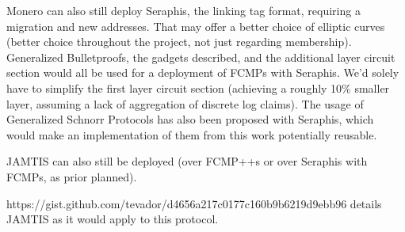 \documentclass[]{article}
\begin{document}
Monero can also still deploy Seraphis, the linking tag format, requiring a migration and new addresses. That may offer a better choice of elliptic curves (better choice throughout the project, not just regarding membership). Generalized Bulletproofs, the gadgets described, and the additional layer circuit section would all be used for a deployment of FCMPs with Seraphis. We'd solely have to simplify the first layer circuit section (achieving a roughly 10\% smaller layer, assuming a lack of aggregation of discrete log claims). The usage of Generalized Schnorr Protocols has also been proposed with Seraphis, which would make an implementation of them from this work potentially reusable.

JAMTIS can also still be deployed (over FCMP++s or over Seraphis with FCMPs, as prior planned).

https://gist.github.com/tevador/d4656a217c0177c160b9b6219d9ebb96 details JAMTIS as it would apply to this protocol.
\end{document}
